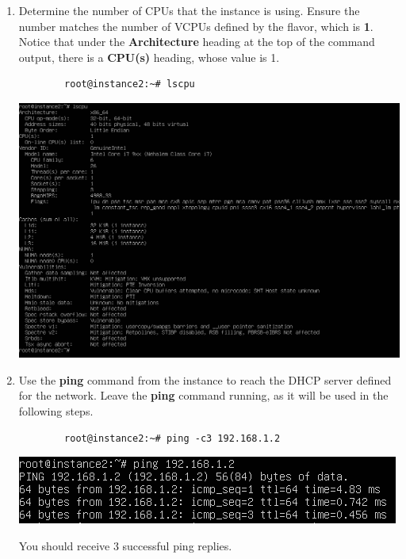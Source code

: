 \documentclass[letterpaper, 12pt]{article}
\begin{document}
\begin{enumerate}
    \item Determine the number of CPUs that the instance is using. Ensure the number matches the number of VCPUs defined
    by the flavor, which is \textbf{1}. Notice that under the \textbf{Architecture} heading at the top of the command
    output, there is a \textbf{CPU(s)} heading, whose value is 1.
    \begin{lstlisting}
        root@instance2:~# lscpu
    \end{lstlisting}

    \begin{center}
        \includegraphics[width=\linewidth]{images/part5/step9.png}
    \end{center}

    \item Use the \textbf{ping} command from the instance to reach the DHCP server defined for the network.
    Leave the \textbf{ping} command running, as it will be used in the following steps.
    \begin{lstlisting}
        root@instance2:~# ping -c3 192.168.1.2
    \end{lstlisting}

    \begin{center}
        \includegraphics[width=\linewidth]{images/part5/step10.png}
    \end{center}

    \begin{notebox}
        You should receive 3 successful ping replies.
    \end{notebox}


\end{enumerate}
\end{document}
